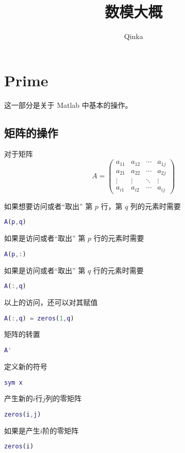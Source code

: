 \documentclass{ctexart}
\author{Qinka}
\title{数模大概}
\begin{document}
  \maketitle
  \section{Prime}
  \label{sec:prime}
  这一部分是关于 Matlab 中基本的操作。

  \subsection{矩阵的操作}
  \label{ssec:mat:base}
  对于矩阵
  $$A=\left(\begin{array}{cccc}
  a_{11} & a_{12} & \cdots & a_{1j} \\
  a_{21} & a_{22} & \cdots & a_{2j} \\
  \vdots & \vdots & \ddots & \vdots \\
  a_{i1} & a_{i2} & \cdots & a_{ij}
  \end{array}\right)$$

  如果想要访问或者“取出” 第 $p$ 行，第 $q$ 列的元素时需要
  \begin{lstlisting}[language=matlab]
    A(p,q)
  \end{lstlisting}

  如果是访问或者“取出” 第 $p$ 行的元素时需要
  \begin{lstlisting}[language=matlab]
    A(p,:)
  \end{lstlisting}

  如果是访问或者“取出” 第 $q$ 行的元素时需要
  \begin{lstlisting}[language=matlab]
    A(:,q)
  \end{lstlisting}

  以上的访问，还可以对其赋值
  \begin{lstlisting}[language=matlab]
    A(:,q) = zeros(1,q)
  \end{lstlisting}

  矩阵的转置
  \begin{lstlisting}[language=matlab]
    A'
  \end{lstlisting}

  定义新的符号
  \begin{lstlisting}[language=matlab]
    sym x
  \end{lstlisting}

  产生新的$i$行$j$列的零矩阵
  \begin{lstlisting}[language=matlab]
    zeros(i,j)
  \end{lstlisting}
  如果是产生$i$阶的零矩阵
  \begin{lstlisting}[language=matlab]
    zeros(i)
  \end{lstlisting}
\end{document}
